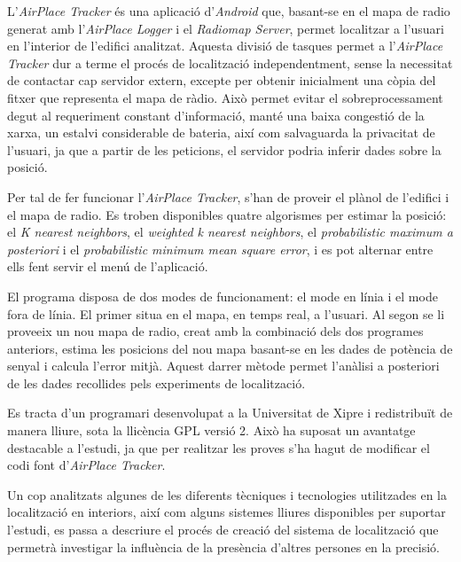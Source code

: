 L'\textit{AirPlace Tracker} és una aplicació d'\textit{Android} que, basant-se en el mapa de radio generat amb l'\textit{AirPlace Logger} i el \textit{Radiomap Server}, permet localitzar a l'usuari en l'interior de l'edifici analitzat. Aquesta divisió de tasques permet a l'\textit{AirPlace Tracker} dur a terme el procés de localització independentment, sense la necessitat de contactar cap servidor extern, excepte per obtenir inicialment una còpia del fitxer que representa el mapa de ràdio. Això permet evitar el sobreprocessament degut al requeriment constant d'informació, manté una baixa congestió de la xarxa, un estalvi considerable de bateria, així com salvaguarda la privacitat de l'usuari, ja que a partir de les peticions, el servidor podria inferir dades sobre la posició.

Per tal de fer funcionar l'\textit{AirPlace Tracker}, s'han de proveir el plànol de l'edifici i el mapa de radio. Es troben disponibles quatre algorismes per estimar la posició: el \textit{K nearest neighbors}, el \textit{weighted k nearest neighbors}, el \textit{probabilistic maximum a posteriori} i el \textit{probabilistic minimum mean square error}, i es pot alternar entre ells fent servir el menú de l'aplicació.

El programa disposa de dos modes de funcionament: el mode en línia i el mode fora de línia. El primer situa en el mapa, en temps real, a l'usuari. Al segon se li proveeix un nou mapa de radio, creat amb la combinació dels dos programes anteriors, estima les posicions del nou mapa basant-se en les dades de potència de senyal i calcula l'error mitjà. Aquest darrer mètode permet l'anàlisi a posteriori de les dades recollides pels experiments de localització.

Es tracta d'un programari desenvolupat a la Universitat de Xipre i redistribuït de manera lliure, sota la llicència GPL versió 2. Això ha suposat un avantatge destacable a l'estudi, ja que per realitzar les proves s'ha hagut de modificar el codi font d'\textit{AirPlace Tracker}.

Un cop analitzats algunes de les diferents tècniques i tecnologies utilitzades en la localització en interiors, així com alguns sistemes lliures disponibles per suportar l'estudi, es passa a descriure el procés de creació del sistema de localització que permetrà investigar la influència de la presència d'altres persones en la precisió.

